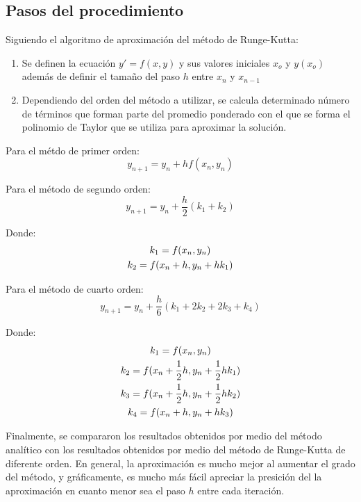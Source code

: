 \documentclass[article, 11pt]{IEEEtran}   %
\begin{document}
\subsection{Pasos del procedimiento}        		
Siguiendo el algoritmo de aproximación del método de Runge-Kutta:
\begin{enumerate}						%
	\item Se definen la ecuación $y\prime=f(x, y)$ y sus valores iniciales $x_o$  y $y(x_o)$ además de definir el tamaño del paso $h$ entre $x_n$ y $x_{n-1}$
	\item Dependiendo del orden del método a utilizar, se calcula determinado número de términos que forman parte del promedio ponderado con el que se forma el polinomio de Taylor que se utiliza para aproximar la solución.
\end{enumerate}

\vspace{1em}

Para el métdo de primer orden:
\begin{equation}
	y_{n+1}=y_n+hf(x_n, y_n)
\end{equation}

Para el método de segundo orden:
\begin{equation}
y_{n+1}=y_n+\frac{h}{2}(k_1+k_2)
\end{equation}

Donde:
\begin{gather*}
k_1=f(x_n,y_n)\notag\\
k_2=f(x_n+h,y_n+hk_1)
\end{gather*}

Para el método de cuarto orden: 
\begin{equation}
y_{n+1}=y_n+\frac{h}{6}(k_1+2k_2+2k_3+k_4)
\end{equation}

Donde:
\begin{gather*}
k_1=f(x_n, y_n)\notag\\
k_2=f(x_n+\frac{1}{2}h, y_n+\frac{1}{2}hk_1)\\
k_3=f(x_n+\frac{1}{2}h, y_n+\frac{1}{2}hk_2)\\
k_4=f(x_n+h, y_n+hk_3)
\end{gather*}

Finalmente, se compararon los resultados obtenidos por medio del método analítico con los resultados obtenidos por medio del método de Runge-Kutta de diferente orden. En general, la aproximación es mucho mejor al aumentar el grado del método, y gráficamente, es mucho más fácil apreciar la presición del la aproximación en cuanto menor sea el paso $h$ entre cada iteración.
\end{document}
